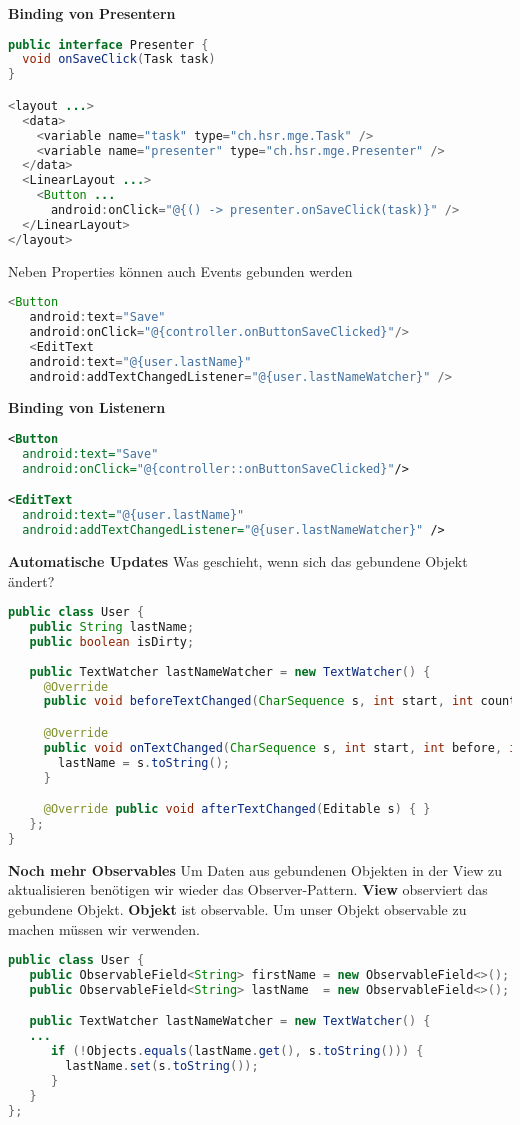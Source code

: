 \textbf{Binding von Presentern}
\begin{lstlisting}[language=java]
public interface Presenter { 
  void onSaveClick(Task task) 
} 

<layout ...>
  <data>
    <variable name="task" type="ch.hsr.mge.Task" />
    <variable name="presenter" type="ch.hsr.mge.Presenter" />
  </data>
  <LinearLayout ...>
    <Button ...
      android:onClick="@{() -> presenter.onSaveClick(task)}" />
  </LinearLayout> 
</layout> 
\end{lstlisting}
Neben Properties können auch Events gebunden werden
\begin{lstlisting}[language=java]
<Button
   android:text="Save"
   android:onClick="@{controller.onButtonSaveClicked}"/>
   <EditText
   android:text="@{user.lastName}"
   android:addTextChangedListener="@{user.lastNameWatcher}" />
\end{lstlisting}
\textbf{Binding von Listenern}
\begin{lstlisting}[language=xml]
<Button
  android:text="Save"
  android:onClick="@{controller::onButtonSaveClicked}"/>

<EditText
  android:text="@{user.lastName}"
  android:addTextChangedListener="@{user.lastNameWatcher}" />
\end{lstlisting}
\textbf{Automatische Updates}
Was geschieht, wenn sich das gebundene Objekt ändert?
\begin{lstlisting}[language=java]
public class User {
   public String lastName;
   public boolean isDirty;
  
   public TextWatcher lastNameWatcher = new TextWatcher() {
     @Override
     public void beforeTextChanged(CharSequence s, int start, int count, int after) { }

     @Override
     public void onTextChanged(CharSequence s, int start, int before, int count) {
       lastName = s.toString();
     }

     @Override public void afterTextChanged(Editable s) { }
   };
}
\end{lstlisting}
\textbf{Noch mehr Observables}
Um Daten aus gebundenen Objekten in der View zu aktualisieren benötigen wir wieder das Observer-Pattern. \textbf{View} observiert das gebundene Objekt. \textbf{Objekt} ist observable. Um unser Objekt observable zu machen müssen wir  verwenden.
\begin{lstlisting}[language=java]
public class User {
   public ObservableField<String> firstName = new ObservableField<>();
   public ObservableField<String> lastName  = new ObservableField<>();

   public TextWatcher lastNameWatcher = new TextWatcher() {
   ...
      if (!Objects.equals(lastName.get(), s.toString())) {
        lastName.set(s.toString());
      }
   }
};
\end{lstlisting}
